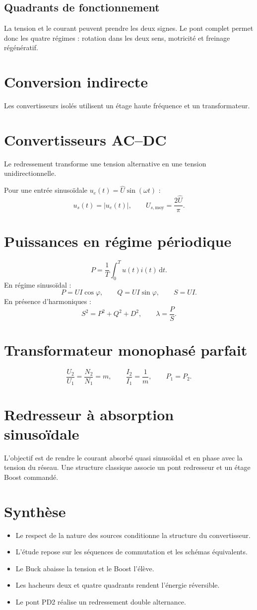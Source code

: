 \subsection{Quadrants de fonctionnement}
La tension et le courant peuvent prendre les deux signes. Le pont complet permet donc les quatre régimes : rotation dans les deux sens, motricité et freinage régénératif.

\section{Conversion indirecte}
Les convertisseurs isolés utilisent un étage haute fréquence et un transformateur.

\section{Convertisseurs AC--DC}
Le redressement transforme une tension alternative en une tension unidirectionnelle.
\begin{center}\TLPontDiodes\end{center}
Pour une entrée sinusoïdale $u_e(t)=\widehat U\sin(\omega t)$ :
\[
u_s(t)=|u_e(t)|,\qquad U_{s,\mathrm{moy}}=\frac{2\widehat U}{\pi}.
\]

\section{Puissances en régime périodique}
\[
P=\frac1T\int_0^T u(t)i(t)\,\mathrm dt.
\]
En régime sinusoïdal :
\[
P=UI\cos\varphi,\qquad Q=UI\sin\varphi,\qquad S=UI.
\]
En présence d'harmoniques :
\[
S^2=P^2+Q^2+D^2,\qquad \lambda=\frac{P}{S}.
\]

\section{Transformateur monophasé parfait}
\[
\frac{U_2}{U_1}=\frac{N_2}{N_1}=m,
\qquad \frac{I_2}{I_1}=\frac1m,
\qquad P_1=P_2.
\]

\section{Redresseur à absorption sinusoïdale}
L'objectif est de rendre le courant absorbé quasi sinusoïdal et en phase avec la tension du réseau. Une structure classique associe un pont redresseur et un étage Boost commandé.

\section{Synthèse}
\begin{itemize}
\item Le respect de la nature des sources conditionne la structure du convertisseur.
\item L'étude repose sur les séquences de commutation et les schémas équivalents.
\item Le Buck abaisse la tension et le Boost l'élève.
\item Les hacheurs deux et quatre quadrants rendent l'énergie réversible.
\item Le pont PD2 réalise un redressement double alternance.
\end{itemize}
